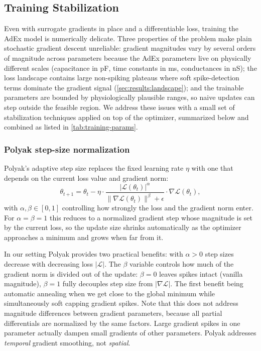 \subsection{Training Stabilization}\label{sec:method:opt:stabilization}
Even with surrogate gradients in place and a differentiable loss, training the \gls{AdEx} model is numerically delicate.
Three properties of the problem make plain stochastic gradient descent unreliable:
gradient magnitudes vary by several orders of magnitude across parameters because the \gls{AdEx} parameters live on physically different scales (capacitance in pF, time constants in ms, conductances in nS);
the loss landscape contains large non-spiking plateaus where soft spike-detection terms dominate the gradient signal (\cref{sec:results:landscape});
and the trainable parameters are bounded by physiologically plausible ranges, so naive updates can step outside the feasible region.
We address these issues with a small set of stabilization techniques applied on top of the optimizer, summarized below and combined as listed in \cref{tab:training-params}.

\subsubsection{Polyak step-size normalization}\label{sec:method:opt:stabilization:polyak}
Polyak's adaptive step size \cite{Polyak1964} replaces the fixed learning rate $\eta$ with one that depends on the current loss value and gradient norm:
\begin{equation}
    \theta_{t+1} = \theta_t - \eta \cdot \frac{|\mathcal{L}(\theta_t)|^{\alpha}}{\|\nabla \mathcal{L}(\theta_t)\|^{\beta} + \epsilon} \cdot \nabla \mathcal{L}(\theta_t),
\end{equation}
with $\alpha, \beta \in [0,1]$ controlling how strongly the loss and the gradient norm enter.
For $\alpha = \beta = 1$ this reduces to a normalized gradient step whose magnitude is set by the current loss,
so the update size shrinks automatically as the optimizer approaches a minimum and grows when far from it.

In our setting Polyak provides two practical benefits: with $\alpha > 0$ step sizes decrease with decreasing loss $|\mathcal{L}|$.
The $\beta$ variable controls how much of the gradient norm is divided out of the update:
$\beta=0$ leaves spikes intact (vanilla magnitude), $\beta=1$ fully decouples step size from $|\nabla\mathcal{L}|$.
The first benefit being automatic annealing when we get close to the global minimum while simultaneously soft capping gradient spikes.
Note that this does not address magnitude differences between gradient parameters, because all partial differentials are normalized by the same factors.
Large gradient spikes in one parameter actually dampen small gradients of other parameters.
Polyak addresses \emph{temporal} gradient smoothing, not \emph{spatial}.

